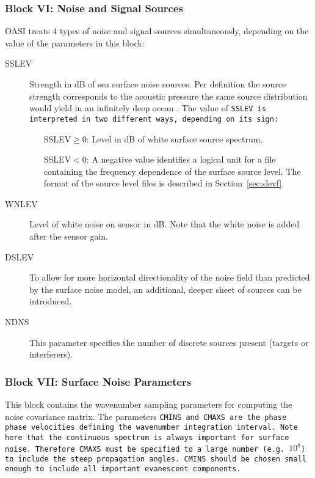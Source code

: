 \subsubsection{Block VI: Noise and Signal Sources}

OASI treats 4 types of noise and signal sources simultaneously,
depending on the value of the parameters in this block:

\begin{description}
\item[SSLEV] Strength in dB of sea surface noise sources. Per
definition the source strength corresponds to the acoustic pressure
the same source distribution would yield in an infinitely deep ocean
\cite{jkps,sk:jasa88}.
The value of \tt SSLEV \rm is interpreted in two different ways,
depending on its sign:
\begin{itemize}
\item[SSLEV$\ge0$:] Level in dB of white surface source spectrum.
\item[SSLEV$<0$:] A negative value identifies a logical unit for a file
containing the frequency dependence of the surface source level. The format of
the source level files is described in Section~\ref{sec:slevf}.
\end{itemize}
\item[WNLEV] Level of white noise on sensor in dB. Note that the white
noise is added after the sensor gain.
\item[DSLEV] To allow for more horizontal directionality of the noise
field than predicted by the surface noise model, an additional, deeper
sheet of sources can be introduced.
\item[NDNS] This parameter specifies the number of discrete sources present
(targets or interferers).
\end{description}

\subsubsection{Block VII: Surface Noise Parameters}

This block contains the wavenumber sampling parameters for computing the
noise covariance matrix. The parameters \tt CMINS \rm and \tt CMAXS
\rm are the phase phase velocities defining the wavenumber integration
interval. Note here that the continuous spectrum is always important
for surface noise. Therefore \tt CMAXS \rm must be specified to a
large number (e.g. $10^8$) to include the steep propagation angles.
\tt CMINS \rm should be chosen small enough to include all important
evanescent components. 

